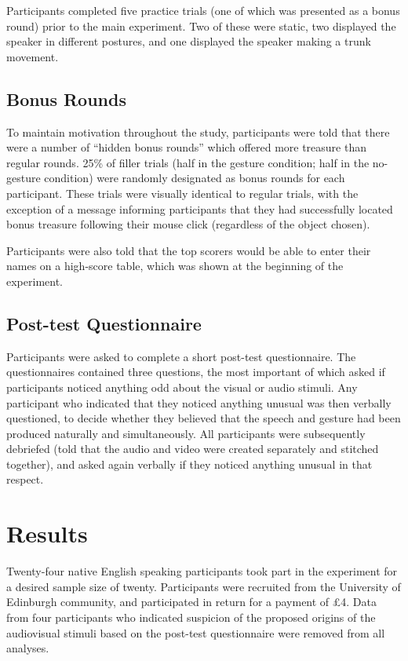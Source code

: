 \documentclass[a4paper,man,natbib]{apa6}
\begin{document}
Participants completed five practice trials (one of which was presented as a bonus round) prior to the main experiment. 
Two of these were static, two displayed the speaker in different postures, and one displayed the speaker making a trunk movement.

\subsection{Bonus Rounds}
To maintain motivation throughout the study, participants were told that there were a number of ``hidden bonus rounds'' which offered more treasure than regular rounds.
25\% of filler trials (half in the gesture condition; half in the no-gesture condition) were randomly designated as bonus rounds for each participant.
These trials were visually identical to regular trials, with the exception of a message informing participants that they had successfully located bonus treasure following their mouse click (regardless of the object chosen).

Participants were also told that the top scorers would be able to enter their names on a high-score table, which was shown at the beginning of the experiment. 

\subsection{Post-test Questionnaire}
Participants were asked to complete a short post-test questionnaire. 
The questionnaires contained three questions, the most important of which asked if participants noticed anything odd about the visual or audio stimuli.
Any participant who indicated that they noticed anything unusual was then verbally questioned, to decide whether they believed that the speech and gesture had been produced naturally and simultaneously.
All participants were subsequently debriefed (told that the audio and video were created separately and stitched together), and asked again verbally if they noticed anything unusual in that respect. 

\section{Results}
Twenty-four native English speaking participants took part in the experiment for a desired sample size of twenty. 
Participants were recruited from the University of Edinburgh community, and participated in return for a payment of \pounds{}4.
Data from four participants who indicated suspicion of the proposed origins of the audiovisual stimuli based on the post-test questionnaire were removed from all analyses.
\end{document}

